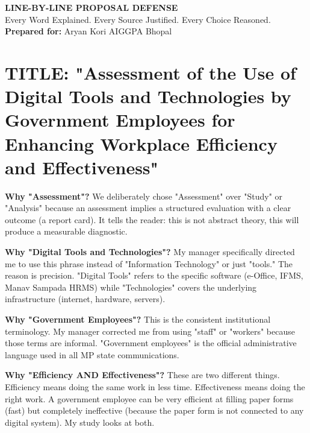 \documentclass[11pt,a4paper]{article}
\begin{document}
\onehalfspacing

\begin{center}
    \Huge\color{navyblue}\textbf{LINE-BY-LINE PROPOSAL DEFENSE} \\[0.4em]
    \large\color{gray}Every Word Explained. Every Source Justified. Every Choice Reasoned. \\[0.2cm]
    \normalsize\color{gold}\textbf{Prepared for:} Aryan Kori \quad\textbar\quad AIGGPA Bhopal
    \vspace{0.5cm}
\end{center}

\section{TITLE: "Assessment of the Use of Digital Tools and Technologies by Government Employees for Enhancing Workplace Efficiency and Effectiveness"}

\begin{abox}
\textbf{Why "Assessment"?} We deliberately chose "Assessment" over "Study" or "Analysis" because an assessment implies a structured evaluation with a clear outcome (a report card). It tells the reader: this is not abstract theory, this will produce a measurable diagnostic.

\textbf{Why "Digital Tools and Technologies"?} My manager specifically directed me to use this phrase instead of "Information Technology" or just "tools." The reason is precision. "Digital Tools" refers to the specific software (e-Office, IFMS, Manav Sampada HRMS) while "Technologies" covers the underlying infrastructure (internet, hardware, servers).

\textbf{Why "Government Employees"?} This is the consistent institutional terminology. My manager corrected me from using "staff" or "workers" because those terms are informal. "Government employees" is the official administrative language used in all MP state communications.

\textbf{Why "Efficiency AND Effectiveness"?} These are two different things. Efficiency means doing the same work in less time. Effectiveness means doing the right work. A government employee can be very efficient at filling paper forms (fast) but completely ineffective (because the paper form is not connected to any digital system). My study looks at both.
\end{abox}
\end{document}
